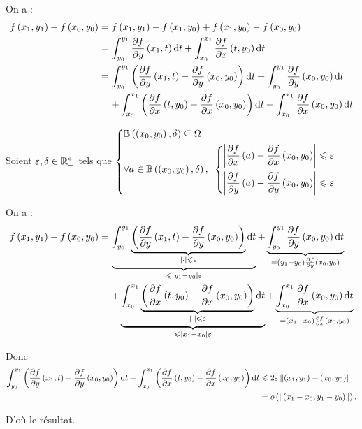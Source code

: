 \begin{dem}
On a : \[\begin{aligned}
f\paren{x_1,y_1}-f\paren{x_0,y_0}&=f\paren{x_1,y_1}-f\paren{x_1,y_0}+f\paren{x_1,y_0}-f\paren{x_0,y_0} \\
&=\int_{y_0}^{y_1}\pdv{f}{y}\paren{x_1,t}\odif{t}+\int_{x_0}^{x_1}\pdv{f}{x}\paren{t,y_0}\odif{t} \\
&=\int_{y_0}^{y_1}\paren{\pdv{f}{y}\paren{x_1,t}-\pdv{f}{y}\paren{x_0,y_0}}\odif{t}+\int_{y_0}^{y_1}\pdv{f}{y}\paren{x_0,y_0}\odif{t} \\
&\color{white}=\color{black}+\int_{x_0}^{x_1}\paren{\pdv{f}{x}\paren{t,y_0}-\pdv{f}{x}\paren{x_0,y_0}}\odif{t}+\int_{x_0}^{x_1}\pdv{f}{x}\paren{x_0,y_0}\odif{t}
\end{aligned}\]

Soient \(\varepsilon,\delta\in\mathbb{R}_+^*\) tels que \(\begin{dcases}
\bouleo{\paren{x_0,y_0}}{\delta}\subset\Omega \\
\quantifs{\forall a\in\bouleo{\paren{x_0,y_0}}{\delta}}\begin{dcases}
\abs{\pdv{f}{x}\paren{a}-\pdv{f}{x}\paren{x_0,y_0}}\leq\epsilon \\
\abs{\pdv{f}{y}\paren{a}-\pdv{f}{y}\paren{x_0,y_0}}\leq\epsilon
\end{dcases}
\end{dcases}\)

On a : \[\begin{aligned}
f\paren{x_1,y_1}-f\paren{x_0,y_0}&=\underbrace{\int_{y_0}^{y_1}\underbrace{\paren{\pdv{f}{y}\paren{x_1,t}-\pdv{f}{y}\paren{x_0,y_0}}}_{\abs{\cdot}\leq\epsilon}\odif{t}}_{\leq\abs{y_1-y_0}\epsilon}+\underbrace{\int_{y_0}^{y_1}\pdv{f}{y}\paren{x_0,y_0}\odif{t}}_{=\paren{y_1-y_0}\pdv{f}{y}\paren{x_0,y_0}} \\
&\color{white}=\color{black}+\underbrace{\int_{x_0}^{x_1}\underbrace{\paren{\pdv{f}{x}\paren{t,y_0}-\pdv{f}{x}\paren{x_0,y_0}}}_{\abs{\cdot}\leq\epsilon}\odif{t}}_{\leq\abs{x_1-x_0}\epsilon}+\underbrace{\int_{x_0}^{x_1}\pdv{f}{x}\paren{x_0,y_0}\odif{t}}_{=\paren{x_1-x_0}\pdv{f}{x}\paren{x_0,y_0}}
\end{aligned}\]

Donc \[\begin{aligned}
\int_{y_0}^{y_1}\paren{\pdv{f}{y}\paren{x_1,t}-\pdv{f}{y}\paren{x_0,y_0}}\odif{t}+\int_{x_0}^{x_1}\paren{\pdv{f}{x}\paren{t,y_0}-\pdv{f}{x}\paren{x_0,y_0}}\odif{t}&\leq2\epsilon\norme{\paren{x_1,y_1}-\paren{x_0,y_0}} \\
&=o\paren{\norme{\paren{x_1-x_0,y_1-y_0}}}.
\end{aligned}\]

D'où le résultat.
\end{dem}

